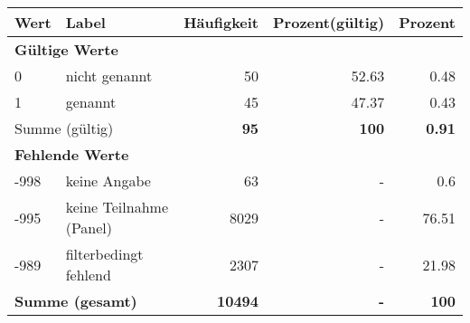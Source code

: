      \begin{longtable}{lXrrr}
     \toprule
     \textbf{Wert} & \textbf{Label} & \textbf{Häufigkeit} & \textbf{Prozent(gültig)} & \textbf{Prozent} \\
     \endhead
     \midrule
     \multicolumn{5}{l}{\textbf{Gültige Werte}}\\

     0 &
     \multicolumn{1}{X}{ nicht genannt   } &


       \num{50} &
       \num[round-mode=places,round-precision=2]{52.63} &
         \num[round-mode=places,round-precision=2]{0.48} \\

     1 &
     \multicolumn{1}{X}{ genannt   } &


       \num{45} &
       \num[round-mode=places,round-precision=2]{47.37} &
         \num[round-mode=places,round-precision=2]{0.43} \\
     \midrule
     \multicolumn{2}{l}{Summe (gültig)} &
       \textbf{\num{95}} &
     \textbf{\num{100}} &
       \textbf{\num[round-mode=places,round-precision=2]{0.91}} \\
     \multicolumn{5}{l}{\textbf{Fehlende Werte}}\\
       -998 &
       keine Angabe &
         \num{63} &
        - &
         \num[round-mode=places,round-precision=2]{0.6} \\
       -995 &
       keine Teilnahme (Panel) &
         \num{8029} &
        - &
         \num[round-mode=places,round-precision=2]{76.51} \\
       -989 &
       filterbedingt fehlend &
         \num{2307} &
        - &
         \num[round-mode=places,round-precision=2]{21.98} \\
     \midrule
     \multicolumn{2}{l}{\textbf{Summe (gesamt)}} &
          \textbf{\num{10494}} &
        \textbf{-} &
        \textbf{\num{100}} \\
     \bottomrule
     \end{longtable}
     
